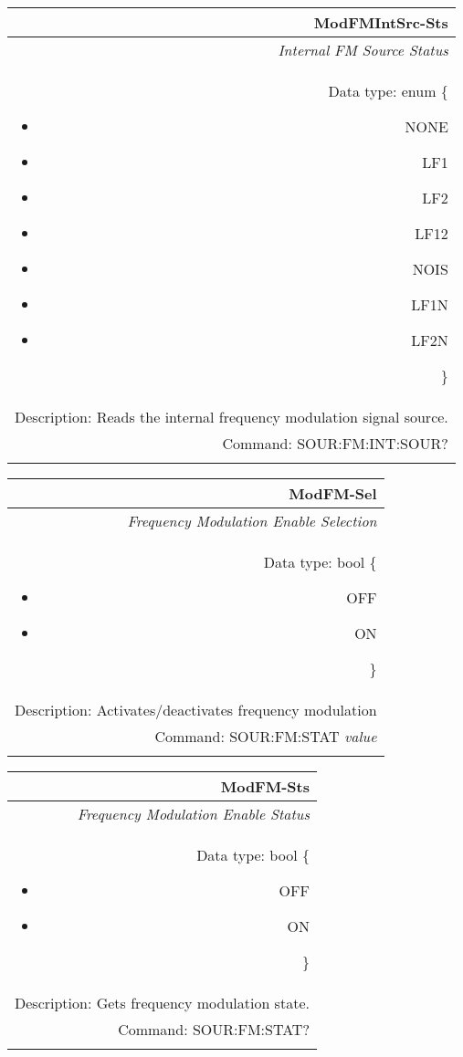 \documentclass[openany]{article}
\begin{document}
		\begin{tabular}{N}
			\hline
			\bfseries ModFMIntSrc-Sts \\ \hline
			\emph{Internal FM Source Status} \\
			Data type: enum \{\begin{itemize}[noitemsep]
				\small
				\item[] NONE
				\item[] LF1
				\item[] LF2
				\item[] LF12
				\item[] NOIS
				\item[] LF1N
				\item[] LF2N
			\end{itemize}\} \\ 
			Description: Reads the internal frequency modulation signal source. \\
			Command: SOUR:FM:INT:SOUR? \\
			\\

		\end{tabular}


		\begin{tabular}{N}
			\hline
			\bfseries ModFM-Sel \\ \hline
			\emph{Frequency Modulation Enable Selection} \\
			Data type: bool \{\begin{itemize}[noitemsep]
				\small
				\item[] OFF
				\item[] ON
			\end{itemize}\} \\
			Description: Activates/deactivates frequency modulation\\
			Command: SOUR:FM:STAT \emph{value} \\
			\\

		\end{tabular}


		\begin{tabular}{N}
			\hline
			\bfseries ModFM-Sts \\ \hline
			\emph{Frequency Modulation Enable Status} \\
			Data type: bool \{\begin{itemize}[noitemsep]
				\small
				\item[] OFF
				\item[] ON
			\end{itemize}\} \\
			Description: Gets frequency modulation state. \\
			Command: SOUR:FM:STAT? \\
			\\
			
		\end{tabular}
\end{document}
